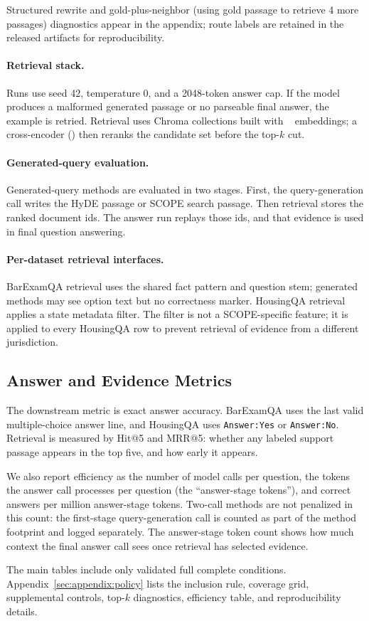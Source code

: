 Structured rewrite and gold-plus-neighbor (using gold passage to retrieve 4 more passages) diagnostics appear in the
appendix; route labels are retained in the released artifacts for
reproducibility.

\paragraph{Retrieval stack.}
Runs use seed 42, temperature 0, and a 2048-token answer cap. If the model
produces a malformed generated passage or no parseable final answer, the example is retried. Retrieval
uses Chroma collections built with ~\cite{zhang2024mgte, li2023towards}
embeddings; a cross-encoder () then reranks
the candidate set before the top-$k$ cut.

\paragraph{Generated-query evaluation.}
Generated-query methods are evaluated in two stages. First, the query-generation
call writes the HyDE passage or SCOPE search passage. Then retrieval stores
the ranked document ids. The answer run replays those ids, and that evidence is used in final question answering.

\paragraph{Per-dataset retrieval interfaces.}
BarExamQA retrieval uses the shared fact pattern and question stem;
generated methods may see option text but no correctness marker. HousingQA
retrieval applies a state metadata filter. The filter is
not a SCOPE-specific feature; it is applied to every HousingQA row to
prevent retrieval of evidence from a different jurisdiction.

\subsection{Answer and Evidence Metrics}

The downstream metric is exact answer accuracy. BarExamQA uses the last valid
multiple-choice answer line, and HousingQA uses \texttt{Answer:Yes} or \texttt{Answer:No}. Retrieval is measured by Hit@5 and MRR@5: whether any
labeled support passage appears in the top five, and how early it appears.

We also report efficiency as the number of model calls per question, the
tokens the answer call processes per question (the ``answer-stage tokens''),
and correct answers per million answer-stage tokens. Two-call methods are
not penalized in this count: the first-stage query-generation call is
counted as part of the method footprint and logged separately. The
answer-stage token count shows how much context the final answer call sees
once retrieval has selected evidence.

The main tables include only validated full complete conditions.
Appendix~\ref{sec:appendix:policy} lists the inclusion rule,
coverage grid, supplemental controls, top-$k$ diagnostics, efficiency table,
and reproducibility details.
